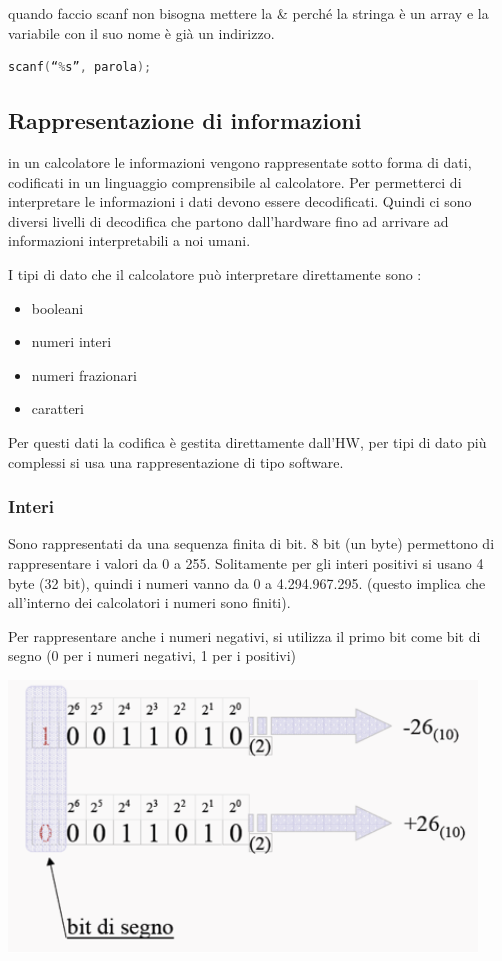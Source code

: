 \documentclass[
  paper=a4,
  oneside  ,captions=tableheading
]{scrbook}
\providecommand{\tightlist}{%
  \setlength{\itemsep}{0pt}\setlength{\parskip}{0pt}}
\begin{document}
quando faccio scanf non bisogna mettere la \& perché la stringa è un
array e la variabile con il suo nome è già un indirizzo.

\begin{lstlisting}[language={C++}]
scanf(“%s”, parola);
\end{lstlisting}

\hypertarget{rappresentazione-di-informazioni}{%
\subsection{Rappresentazione di
informazioni}\label{rappresentazione-di-informazioni}}

in un calcolatore le informazioni vengono rappresentate sotto forma di
dati, codificati in un linguaggio comprensibile al calcolatore. Per
permetterci di interpretare le informazioni i dati devono essere
decodificati. Quindi ci sono diversi livelli di decodifica che partono
dall'hardware fino ad arrivare ad informazioni interpretabili a noi
umani.

I tipi di dato che il calcolatore può interpretare direttamente sono :

\begin{itemize}
\tightlist
\item
  booleani
\item
  numeri interi
\item
  numeri frazionari
\item
  caratteri
\end{itemize}

Per questi dati la codifica è gestita direttamente dall'HW, per tipi di
dato più complessi si usa una rappresentazione di tipo software.

\hypertarget{interi}{%
\subsubsection{Interi}\label{interi}}

Sono rappresentati da una sequenza finita di bit. 8 bit (un byte)
permettono di rappresentare i valori da 0 a 255. Solitamente per gli
interi positivi si usano 4 byte (32 bit), quindi i numeri vanno da 0 a
4.294.967.295. (questo implica che all'interno dei calcolatori i numeri
sono finiti).

Per rappresentare anche i numeri negativi, si utilizza il primo bit come
bit di segno (0 per i numeri negativi, 1 per i positivi)

\includegraphics{./image/image-20201212110945997.png}
\end{document}
